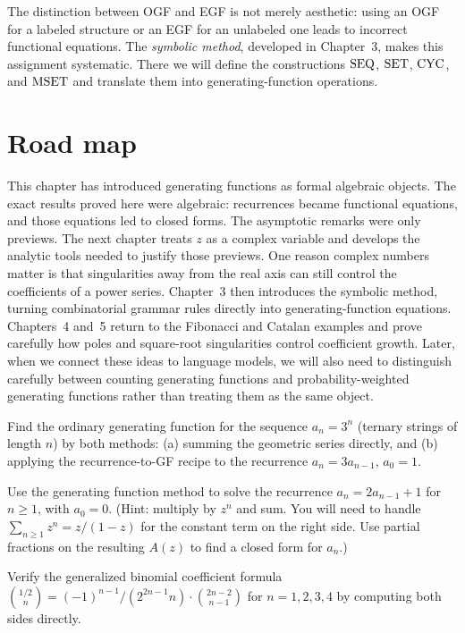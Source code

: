 The distinction between OGF and EGF is not merely aesthetic: using an OGF for a labeled structure or an EGF for an unlabeled one leads to incorrect functional equations. The \emph{symbolic method}, developed in Chapter~3, makes this assignment systematic. There we will define the constructions $\operatorname{SEQ}$, $\operatorname{SET}$, $\operatorname{CYC}$, and $\operatorname{MSET}$ and translate them into generating-function operations.

\section*{Road map}

This chapter has introduced generating functions as formal algebraic objects. The exact results proved here were algebraic: recurrences became functional equations, and those equations led to closed forms. The asymptotic remarks were only previews. The next chapter treats $z$ as a complex variable and develops the analytic tools needed to justify those previews. One reason complex numbers matter is that singularities away from the real axis can still control the coefficients of a power series. Chapter~3 then introduces the symbolic method, turning combinatorial grammar rules directly into generating-function equations. Chapters~4 and~5 return to the Fibonacci and Catalan examples and prove carefully how poles and square-root singularities control coefficient growth. Later, when we connect these ideas to language models, we will also need to distinguish carefully between counting generating functions and probability-weighted generating functions rather than treating them as the same object.

\begin{exercise}
Find the ordinary generating function for the sequence $a_n = 3^n$ (ternary strings of length $n$) by both methods: (a) summing the geometric series directly, and (b) applying the recurrence-to-GF recipe to the recurrence $a_n = 3a_{n-1}$, $a_0 = 1$.
\end{exercise}

\begin{exercise}
Use the generating function method to solve the recurrence $a_n = 2a_{n-1} + 1$ for $n \ge 1$, with $a_0 = 0$. (Hint: multiply by $z^n$ and sum. You will need to handle $\sum_{n \ge 1} z^n = z/(1-z)$ for the constant term on the right side. Use partial fractions on the resulting $A(z)$ to find a closed form for $a_n$.)
\end{exercise}

\begin{exercise}
Verify the generalized binomial coefficient formula $\binom{1/2}{n} = (-1)^{n-1}/(2^{2n-1} n) \cdot \binom{2n-2}{n-1}$ for $n = 1, 2, 3, 4$ by computing both sides directly.
\end{exercise}

